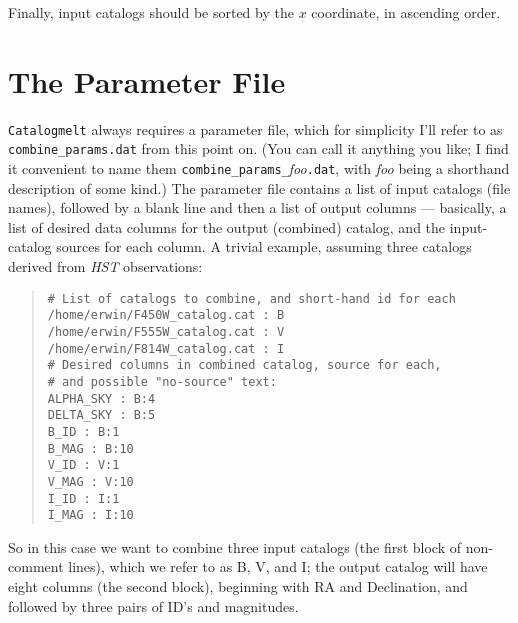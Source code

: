 \documentclass[10pt]{article}
\begin{document}
Finally, input catalogs should be sorted by the $x$ coordinate, in 
ascending order.



\section{The Parameter File}\label{sec:paramfile}

\texttt{Catalogmelt} always requires a parameter file, which for
simplicity I'll refer to as \texttt{combine\_params.dat} from this
point on.  (You can call it anything you like; I find it convenient to
name them \texttt{combine\_params\_}\textit{foo}\texttt{.dat}, with
\textit{foo} being a shorthand description of some kind.)  The
parameter file contains a list of input catalogs (file names),
followed by a blank line and then a list of output columns ---
basically, a list of desired data columns for the output (combined)
catalog, and the input-catalog sources for each column.  A trivial
example, assuming three catalogs derived from \textit{HST}
observations:

\begin{quote}
  \texttt{\# List of catalogs to combine, and short-hand id for each}\\
  \texttt{/home/erwin/F450W\_catalog.cat  : B}\\
  \texttt{/home/erwin/F555W\_catalog.cat  : V}\\
  \texttt{/home/erwin/F814W\_catalog.cat  : I}\\
  
  \texttt{\# Desired columns in combined catalog, source for each,}\\
  \texttt{\# and possible "no-source" text:}\\
  \texttt{ALPHA\_SKY           : B:4}\\
  \texttt{DELTA\_SKY           : B:5}\\
  \texttt{B\_ID                : B:1}\\
  \texttt{B\_MAG               : B:10}\\
  \texttt{V\_ID                : V:1}\\
  \texttt{V\_MAG               : V:10}\\
  \texttt{I\_ID                : I:1}\\
  \texttt{I\_MAG               : I:10}\\
\end{quote}

So in this case we want to combine three input catalogs (the first
block of non-comment lines), which we refer to as B, V, and I; the
output catalog will have eight columns (the second block), beginning
with RA and Declination, and followed by three pairs of ID's and
magnitudes.
\end{document}
